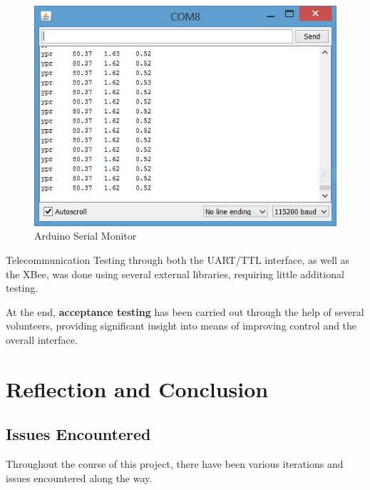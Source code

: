 \documentclass[12p,a4paper]{report}
\begin{document}
\begin{figure}[H]
\begin{center}
\includegraphics{serialmonitor}
\caption{Arduino Serial Monitor}
\label{fig:serialmonitor}
\end{center}
\end{figure}



Telecommunication Testing through both the UART/TTL interface, as well as the XBee, was done using several external libraries, requiring little additional testing.

At the end, \textbf{acceptance testing} has been carried out through the help of several volunteers, providing significant insight into means of improving control and the overall interface.

\chapter{Reflection and Conclusion}
\section{Issues Encountered}
Throughout the course of this project, there have been various iterations and issues encountered along the way.
\end{document}

